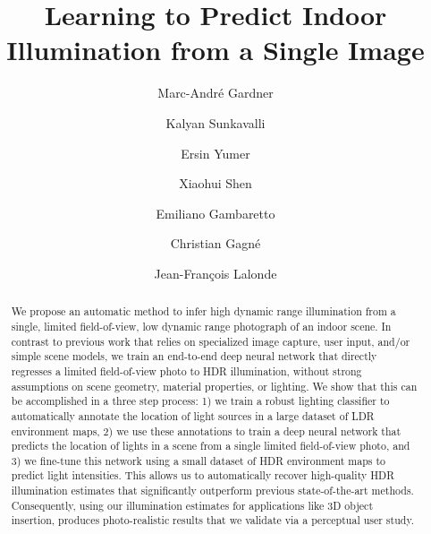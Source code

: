 \documentclass[acmtog]{acmart}
\newcommand{\MAG}[1]{\textcolor{green}{[\textsc{MAG}: \emph{#1}]}}
\begin{document}
\title{Learning to Predict Indoor Illumination from a Single Image}

\author{Marc-Andr\'e Gardner}
\author{Kalyan Sunkavalli}
\author{Ersin Yumer}
\author{Xiaohui Shen}
\author{Emiliano Gambaretto}
\author{Christian Gagn\'e}
\author{Jean-Fran\c cois Lalonde}

\renewcommand\shortauthors{}

\begin{abstract}
We propose an automatic method to infer high dynamic range illumination from a single, limited field-of-view, low dynamic range photograph of an indoor scene.
In contrast to previous work that relies on specialized image capture, user input, and/or simple scene models, we train an end-to-end deep neural network that directly regresses a limited field-of-view photo to HDR illumination, without strong assumptions on scene geometry, material properties, or lighting. We show that this can be accomplished in a three step process: 1) we train a robust lighting classifier to automatically annotate the location of light sources in a large dataset of LDR environment maps, 2) we use these annotations to train a deep neural network that predicts the location of lights in a scene from a single limited field-of-view photo, and 3) we fine-tune this network using a small dataset of HDR environment maps to predict light intensities. This allows us to automatically recover high-quality HDR illumination estimates that significantly outperform previous state-of-the-art methods. Consequently, using our illumination estimates for applications like 3D object insertion, produces photo-realistic results that we validate via a perceptual user study.


 
\end{abstract}

%
\end{document}
